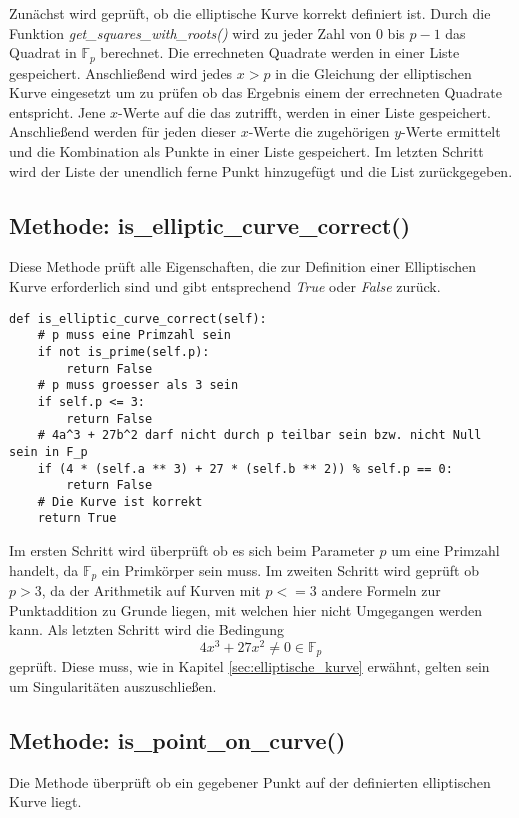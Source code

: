 Zunächst wird geprüft, ob die elliptische Kurve korrekt definiert ist. Durch die Funktion \textit{get\_squares\_with\_roots()} wird zu jeder Zahl von $0$ bis $p-1$ das Quadrat in $\mathbb{F}_p$ berechnet. Die errechneten Quadrate werden in einer Liste gespeichert. Anschließend wird jedes $x > p$ in die Gleichung der elliptischen Kurve eingesetzt um zu prüfen ob das Ergebnis einem der errechneten Quadrate entspricht. Jene $x$-Werte auf die das zutrifft, werden in einer Liste gespeichert. Anschließend werden für jeden dieser $x$-Werte die zugehörigen $y$-Werte ermittelt und die Kombination als Punkte in einer Liste gespeichert. Im letzten Schritt wird der Liste der unendlich ferne Punkt hinzugefügt und die List zurückgegeben.
\subsection{Methode: is\_elliptic\_curve\_correct()}
Diese Methode prüft alle Eigenschaften, die zur Definition einer Elliptischen Kurve erforderlich sind und gibt entsprechend \textit{True} oder \textit{False} zurück.

\vspace{\baselineskip}
\begin{lstlisting}[caption={Methode: is\_elliptic\_curve\_correct()}, captionpos=b]
def is_elliptic_curve_correct(self):
	# p muss eine Primzahl sein
	if not is_prime(self.p):
		return False
	# p muss groesser als 3 sein
    if self.p <= 3:
        return False
	# 4a^3 + 27b^2 darf nicht durch p teilbar sein bzw. nicht Null sein in F_p
	if (4 * (self.a ** 3) + 27 * (self.b ** 2)) % self.p == 0:
		return False
	# Die Kurve ist korrekt
    return True
\end{lstlisting}
\vspace{\baselineskip}
Im ersten Schritt wird überprüft ob es sich beim Parameter $p$ um eine Primzahl handelt, da $\mathbb{F}_p$ ein Primkörper sein muss. Im zweiten Schritt wird geprüft ob $p > 3$, da der Arithmetik auf Kurven mit $p <= 3$ andere Formeln zur Punktaddition zu Grunde liegen, mit welchen hier nicht Umgegangen werden kann. Als letzten Schritt wird die Bedingung $$4x^3 + 27x^2 \neq 0 \in \mathbb{F}_p$$ geprüft. Diese muss, wie in Kapitel \ref{sec:elliptische_kurve} erwähnt, gelten sein um Singularitäten auszuschließen.

\subsection{Methode: is\_point\_on\_curve()}
Die Methode überprüft ob ein gegebener Punkt auf der definierten elliptischen Kurve liegt.

